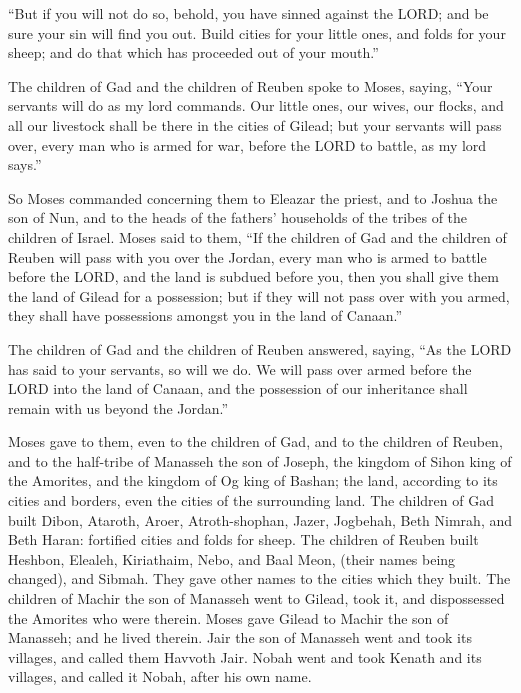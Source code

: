  ``But if you will not do so, behold, you have sinned
against the LORD; and be sure your sin will find you out.
 Build cities for your little ones, and folds for your
sheep; and do that which has proceeded out of your mouth.''

 The children of Gad and the children of Reuben spoke to
Moses, saying, ``Your servants will do as my lord commands.
 Our little ones, our wives, our flocks, and all our
livestock shall be there in the cities of Gilead;  but
your servants will pass over, every man who is armed for war, before the
LORD to battle, as my lord says.''

 So Moses commanded concerning them to Eleazar the
priest, and to Joshua the son of Nun, and to the heads of the fathers'
households of the tribes of the children of Israel. 
Moses said to them, ``If the children of Gad and the children of Reuben
will pass with you over the Jordan, every man who is armed to battle
before the LORD, and the land is subdued before you, then you shall give
them the land of Gilead for a possession;  but if they
will not pass over with you armed, they shall have possessions amongst
you in the land of Canaan.''

 The children of Gad and the children of Reuben answered,
saying, ``As the LORD has said to your servants, so will we do.
 We will pass over armed before the LORD into the land of
Canaan, and the possession of our inheritance shall remain with us
beyond the Jordan.''

 Moses gave to them, even to the children of Gad, and to
the children of Reuben, and to the half-tribe of Manasseh the son of
Joseph, the kingdom of Sihon king of the Amorites, and the kingdom of Og
king of Bashan; the land, according to its cities and borders, even the
cities of the surrounding land.  The children of Gad
built Dibon, Ataroth, Aroer,  Atroth-shophan, Jazer,
Jogbehah,  Beth Nimrah, and Beth Haran: fortified cities
and folds for sheep.  The children of Reuben built
Heshbon, Elealeh, Kiriathaim,  Nebo, and Baal Meon,
(their names being changed), and Sibmah. They gave other names to the
cities which they built.  The children of Machir the son
of Manasseh went to Gilead, took it, and dispossessed the Amorites who
were therein.  Moses gave Gilead to Machir the son of
Manasseh; and he lived therein.  Jair the son of Manasseh
went and took its villages, and called them Havvoth Jair.
 Nobah went and took Kenath and its villages, and called
it Nobah, after his own name.

